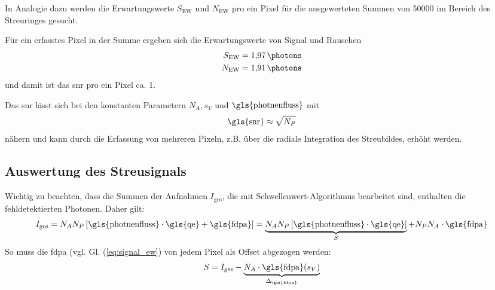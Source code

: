\noindent
In Analogie dazu werden die Erwartungswerte $S_{\text{EW}}$ und $N_{\text{EW}}$ pro ein Pixel für die ausgewerteten Summen von \SI{50000}{\captures} im Bereich des Streuringes gesucht.

\noindent
Für ein erfasstes Pixel in der Summe ergeben sich die Erwartungswerte von Signal und Rauschen \begin{equation}
    \begin{split}
        S_\text{EW} &= \SI{1.97}{\photons}\\
        N_\text{EW} &= \SI{1.91}{\photons}\\
    \end{split}
\end{equation}
und damit ist das \gls{snr} pro ein Pixel ca. 1.

\noindent
Das \gls{snr} lässt sich bei den konstanten Parametern $N_A, s_V$ und $\text{\gls{photnenfluss}}$ mit
\begin{equation}
    \text{\gls{snr}} \approx \sqrt{N_P}
    \label{eq:snr_pixel}
\end{equation}
nähern und kann durch die Erfassung von mehreren Pixeln, z.B. über die radiale Integration des Streubildes, erhöht werden.

\subsection{Auswertung des Streusignals}
Wichtig zu beachten, dass die Summen der Aufnahmen $I_\text{ges}$, die mit Schwellenwert-Algorithmus bearbeitet sind, enthalten die fehldetektierten Photonen. Daher gilt:
\begin{equation}
    I_\text{ges} = N_A N_P \left[\text{\gls{photnenfluss}}\cdot \text{\gls{qe}} + \text{\gls{fdpa}}\right] = \underbrace{N_A N_P \left[\text{\gls{photnenfluss}}\cdot \text{\gls{qe}}\right]}_{S} + N_P N_A\cdot\text{\gls{fdpa}}
\end{equation}
So muss die \gls{fdpa} (vgl. Gl. (\ref{eq:signal_ew}) von jedem Pixel als Offset abgezogen werden:
\begin{equation}
    S = I_\text{ges} - \underbrace{N_A\cdot\text{\gls{fdpa}}(s_V)}_{\Delta_\text{\gls{fdpa}}}
    \label{eq:signal_int_fpda}
\end{equation}


